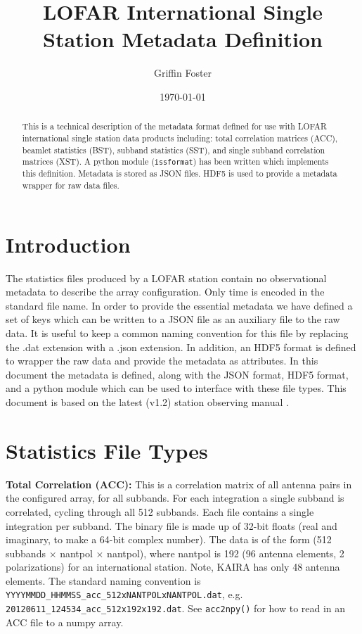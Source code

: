 \documentclass[10pt,a4paper]{article}
\begin{document}
\title{LOFAR International Single Station Metadata Definition}
\author{Griffin Foster}
\date{\today}
\maketitle

\begin{abstract}
This is a technical description of the metadata format defined for use with
LOFAR international single station data products including: total correlation
matrices (ACC), beamlet statistics (BST), subband statistics (SST), and single
subband correlation matrices (XST). A python module (\texttt{issformat}) has
been written which implements this definition. Metadata is stored as JSON files.
HDF5 is used to provide a metadata wrapper for raw data files.
\end{abstract}

\tableofcontents

\section{Introduction}
\label{sec:intro}

The statistics files produced by a LOFAR station contain no observational
metadata to describe the array configuration. Only time is encoded in the
standard file name. In order to provide the essential metadata we have defined a
set of keys which can be written to a JSON file as an auxiliary file to the raw
data. It is useful to keep a common naming convention for this file by replacing
the .dat extension with a .json extension. In addition, an HDF5 format is
defined to wrapper the raw data and provide the metadata as attributes. In this
document the metadata is defined, along with the JSON format, HDF5 format, and a
python module which can be used to interface with these file types. This
document is based on the latest (v1.2) station observing manual
\cite{LOFAR-ASTRON-MAN-064}.

\section{Statistics File Types}

\noindent\textbf{Total Correlation (ACC):} This is a correlation matrix of all
antenna pairs in the configured array, for all subbands. For each integration a
single subband is correlated, cycling through all 512 subbands. Each file
contains a single integration per subband. The binary file is made up of 32-bit
floats (real and imaginary, to make a 64-bit complex number). The data is of the
form (512 subbands $\times$ nantpol $\times$ nantpol), where nantpol is 192 (96
antenna elements, 2 polarizations) for an international station. Note, KAIRA has
only 48 antenna elements. The standard naming convention is
\texttt{YYYYMMDD\_HHMMSS\_acc\_512xNANTPOLxNANTPOL.dat}, e.g.
\texttt{20120611\_124534\_acc\_512x192x192.dat}. See \texttt{acc2npy()} for how
to read in an ACC file to a numpy array.
\\
\end{document}
